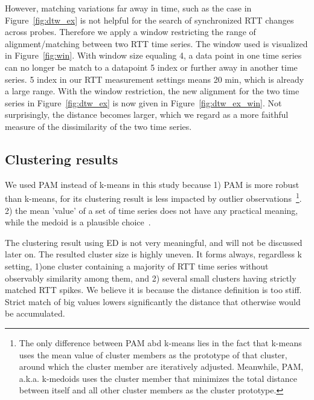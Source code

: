 However, matching variations far away in time, such as the case in Figure~\ref{fig:dtw_ex} is not helpful for the search of synchronized RTT changes across probes.
Therefore we apply a window restricting the range of alignment/matching between two RTT time series. The window used is visualized in Figure~\ref{fig:win}. With window size equaling 4, a data point in one time series can no longer be match to a datapoint 5 index or further away in another time series. 5 index in our RTT measurement settings means 20 min, which is already a large range. 
With the window restriction, the new alignment for the two time series in Figure~\ref{fig:dtw_ex} is now given in Figure~\ref{fig:dtw_ex_win}.
Not surprisingly, the distance becomes larger, which we regard as a more faithful measure of the dissimilarity of the two time series.

\subsection{Clustering results}

We used \ac{PAM} instead of k-means in this study because 1) \ac{PAM} is more robust than k-means, for its clustering result is less impacted by outlier observations~\footnote{The only difference between \ac{PAM} abd k-means lies in the fact that k-means uses the mean value of cluster members as the prototype of that cluster, around which the cluster member are iteratively adjusted. Meanwhile, \ac{PAM}, a.k.a. k-medoids uses the cluster member that minimizes the total distance between itself and all other cluster members as the cluster prototype.}.
2) the mean 'value' of a set of time series does not have any practical meaning, while the medoid is a plausible choice~\cite{Aghabozorgi2015}. 

The clustering result using \ac{ED} is not very meaningful, and will not be discussed later on.
The resulted cluster size is highly uneven. 
It forms always, regardless k setting, 1)one cluster containing a majority of RTT time series without observably similarity among them, and 2) several small clusters having strictly matched RTT spikes.
We believe it is because the distance definition is too stiff.
Strict match of big values lowers significantly the distance that otherwise would be accumulated.

